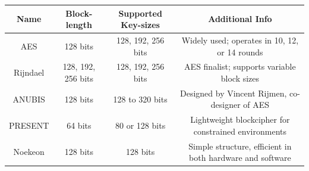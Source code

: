 \documentclass[10pt, a4paper]{article}
\newenvironment{Solution}{\textbf{Solution.}}
\begin{document}
\begin{Solution}
\begin{document}
\begin{table}[H]
\centering
\begin{tabular}{|c|c|c|c|}
\hline
\textbf{Name} & \textbf{Block-length} & \textbf{Supported Key-sizes} & \textbf{Additional Info} \\
\hline
AES         & 128 bits & 128, 192, 256 bits   & Widely used; operates in 10, 12, or 14 rounds \\
Rijndael    & 128, 192, 256 bits & 128, 192, 256 bits & AES finalist; supports variable block sizes  \\
ANUBIS      & 128 bits & 128 to 320 bits      & Designed by Vincent Rijmen, co-designer of AES \\
PRESENT     & 64 bits  & 80 or 128 bits       & Lightweight blockcipher for constrained environments \\
Noekeon     & 128 bits & 128 bits             & Simple structure, efficient in both hardware and software \\
\hline
\end{tabular}
\end{table}
\end{document}

